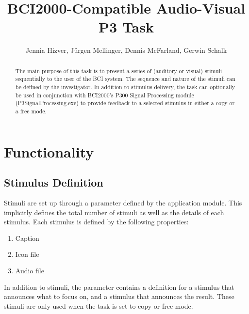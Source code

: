 \documentclass[letterpaper,oneside,12pt]{article}
\begin{document}
%
\title{BCI2000-Compatible Audio-Visual P3 Task}
\author{Jennia Hizver, J\"{u}rgen Mellinger, Dennis McFarland, Gerwin Schalk}
\maketitle

\tableofcontents

\newpage 

\begin{abstract}

The main purpose of this task is to present a series of (auditory or visual) 
stimuli sequentially to the user of the BCI system. The sequence and nature of 
the stimuli can be defined by the investigator. In addition to stimulus 
delivery, the task can optionally be used in conjunction with BCI2000's P300 
Signal Processing module (P3SignalProcessing.exe) to provide feedback to a 
selected stimulus in either a copy or a free mode.

\end{abstract}

\section{Functionality}

\subsection{Stimulus Definition}

Stimuli are set up through a parameter defined by the application module. This
implicitly defines the total number of stimuli as well as the details of each stimulus.
Each stimulus is defined by the following properties:
\begin{enumerate}
 \item Caption
 \item Icon file
 \item Audio file
\end{enumerate}

In addition to stimuli, the parameter contains a definition for a stimulus that 
announces what to focus on, and a stimulus that announces the result. These
stimuli are only used when the task is set to copy or free mode.
\end{document}
